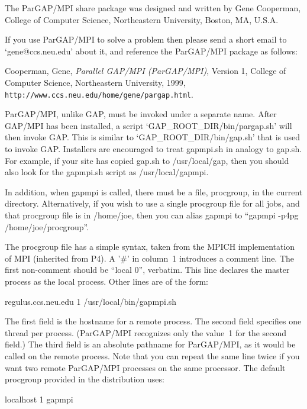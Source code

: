 The ParGAP/MPI
share package was designed and written by Gene Cooperman,
College of Computer Science, Northeastern University, Boston, MA, U.S.A.

If you use ParGAP/MPI to solve a problem then please send a short email
to `gene@ccs.neu.edu' about it, and reference the ParGAP/MPI package
as follows:

\begintt
{}
      Cooperman, Gene,
      {\sl Parallel GAP/MPI (ParGAP/MPI)}, Version 1,
      College of Computer Science, Northeastern University, 1999,
      \verb+http://www.ccs.neu.edu/home/gene/pargap.html+.
\endtt


ParGAP/MPI, unlike GAP, must be invoked under a separate name.  After
GAP/MPI has been installed, a script `GAP_ROOT_DIR/bin/pargap.sh' will
then invoke GAP.  This is similar to `GAP_ROOT_DIR/bin/gap.sh' that is
used to invoke GAP.  Installers are encouraged to treat gapmpi.sh in
analogy to gap.sh.  For example, if your site has copied gap.sh to
/usr/local/gap, then you should also look for the gapmpi.sh script as
/usr/local/gapmpi.

In addition, when gapmpi is called, there must be a file, procgroup,
in the current directory.  Alternatively, if you wish to use a single
procgroup file for all jobs, and that procgroup file is in /home/joe,
then you can alias gapmpi to ``gapmpi -p4pg /home/joe/procgroup''.

The procgroup file has a simple syntax, taken from the MPICH
implementation of MPI (inherited from P4).  A '\#' in column~1
introduces a comment line.  The first non-comment should be ``local 0'',
verbatim.  This line declares the master process as the local process.
Other lines are of the form:

\begintt
regulus.ccs.neu.edu 1 /usr/local/bin/gapmpi.sh
\endtt

The first field is the hostname for a remote process.  The second
field specifies one thread per process.  (ParGAP/MPI recognizes only the
value~1 for the second field.)  The third field is an absolute pathname
for ParGAP/MPI, as it would be called on the remote process.  Note that you can
repeat the same line twice if you want two remote ParGAP/MPI processes on the
same processor.  The default procgroup provided in the distribution
uses:

\begintt
localhost 1 gapmpi
\endtt

